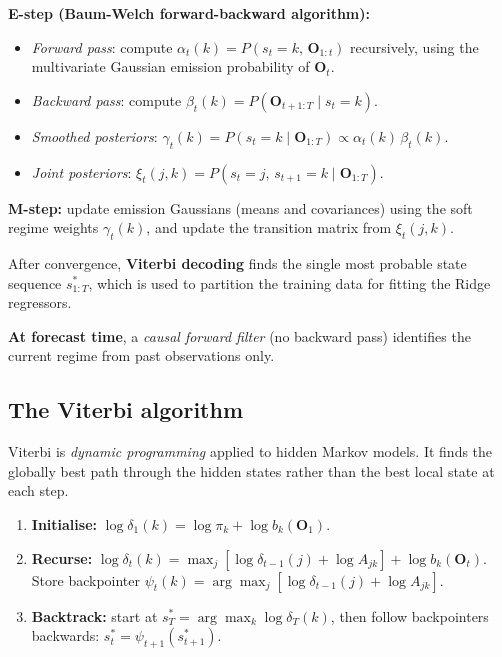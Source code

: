 \documentclass[11pt, a4paper]{article}
\begin{document}
\medskip
\textbf{E-step (Baum-Welch forward-backward algorithm):}
\begin{itemize}[itemsep=2pt]
  \item \emph{Forward pass}: compute $\alpha_t(k) = P(s_t=k,\,\mathbf{O}_{1:t})$
        recursively, using the multivariate Gaussian emission probability of $\mathbf{O}_t$.
  \item \emph{Backward pass}: compute $\beta_t(k) = P(\mathbf{O}_{t+1:T}\mid s_t=k)$.
  \item \emph{Smoothed posteriors}: $\gamma_t(k) = P(s_t=k\mid \mathbf{O}_{1:T}) \propto \alpha_t(k)\,\beta_t(k)$.
  \item \emph{Joint posteriors}: $\xi_t(j,k) = P(s_t=j,\,s_{t+1}=k\mid\mathbf{O}_{1:T})$.
\end{itemize}

\textbf{M-step:} update emission Gaussians (means and covariances) using the
soft regime weights $\gamma_t(k)$, and update the transition matrix from
$\xi_t(j,k)$.

After convergence, \textbf{Viterbi decoding} finds the single most probable
state sequence $s^*_{1:T}$, which is used to partition the training data for
fitting the Ridge regressors.

\textbf{At forecast time}, a \emph{causal forward filter} (no backward pass)
identifies the current regime from past observations only.

\subsection{The Viterbi algorithm}

Viterbi is \emph{dynamic programming} applied to hidden Markov models. It
finds the globally best path through the hidden states rather than the
best local state at each step.

\begin{enumerate}[leftmargin=*, itemsep=2pt]
  \item \textbf{Initialise:} $\log\delta_1(k) = \log\pi_k + \log b_k(\mathbf{O}_1)$.
  \item \textbf{Recurse:} $\log\delta_t(k) = \max_j[\log\delta_{t-1}(j) + \log A_{jk}] + \log b_k(\mathbf{O}_t)$.\\
        Store backpointer $\psi_t(k) = \arg\max_j[\log\delta_{t-1}(j) + \log A_{jk}]$.
  \item \textbf{Backtrack:} start at $s^*_T = \arg\max_k\log\delta_T(k)$, then
        follow backpointers backwards: $s^*_t = \psi_{t+1}(s^*_{t+1})$.
\end{enumerate}
\end{document}
